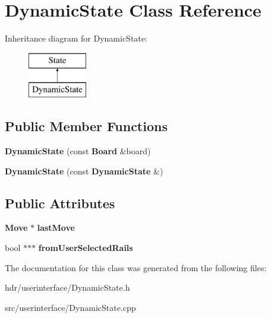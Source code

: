 \section{Dynamic\-State Class Reference}
\label{class_dynamic_state}
Inheritance diagram for Dynamic\-State\-:\begin{figure}[H]
\begin{center}
\leavevmode
\includegraphics[height=2.000000cm]{class_dynamic_state}
\end{center}
\end{figure}
\subsection*{Public Member Functions}
\begin{DoxyCompactItemize}
\item 
{\bfseries Dynamic\-State} (const {\bf Board} \&board)\label{class_dynamic_state_a888844762663eb09cfde480c669213b4}

\item 
{\bfseries Dynamic\-State} (const {\bf Dynamic\-State} \&)\label{class_dynamic_state_a941655a6f314688d8da1dcb6167c5495}

\end{DoxyCompactItemize}
\subsection*{Public Attributes}
\begin{DoxyCompactItemize}
\item 
{\bf Move} $\ast$ {\bfseries last\-Move}\label{class_dynamic_state_ada602a437f88f5761899b730c7ebad23}

\item 
bool $\ast$$\ast$$\ast$ {\bfseries from\-User\-Selected\-Rails}\label{class_dynamic_state_afcb9717d122517126acc39b845a209d9}

\end{DoxyCompactItemize}


The documentation for this class was generated from the following files\-:\begin{DoxyCompactItemize}
\item 
hdr/userinterface/Dynamic\-State.\-h\item 
src/userinterface/Dynamic\-State.\-cpp\end{DoxyCompactItemize}
